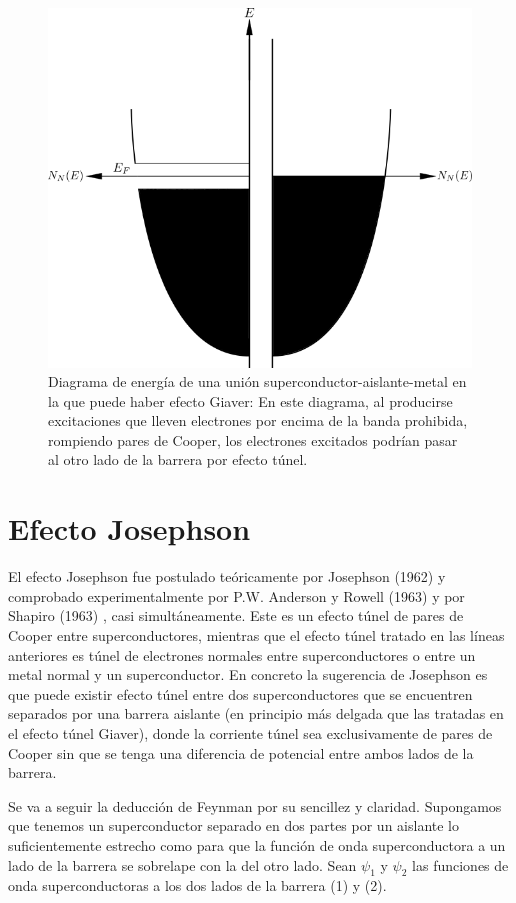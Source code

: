 \begin{figure}[H]
\centering \includegraphics[width=0.8\linewidth]{img/el3.png}
\caption[Diagrama de energía de una unión superconductor-aislante-metal en la que puede haber efecto Giaver]{Diagrama de energía de una unión superconductor-aislante-metal en la que puede haber efecto Giaver: En este diagrama, al producirse excitaciones que lleven electrones por encima de la banda prohibida, rompiendo pares de Cooper, los electrones excitados podrían pasar al otro lado de la barrera por efecto túnel.}
\label{fig:el3}
\end{figure}

\section{Efecto Josephson}

El efecto Josephson fue postulado teóricamente por Josephson (1962) \cite{josephson} y comprobado experimentalmente por P.W. Anderson y Rowell (1963) \cite{rowell} y por Shapiro (1963) \cite{shapiro}, casi simultáneamente. Este es un efecto túnel de pares de Cooper entre superconductores, mientras que el efecto túnel tratado en las líneas anteriores es túnel de electrones normales entre superconductores o entre un metal normal y un superconductor. En concreto la sugerencia de Josephson es que puede existir efecto túnel entre dos superconductores que se encuentren separados por una barrera aislante (en principio más delgada que las tratadas en el efecto túnel Giaver), donde la corriente túnel sea exclusivamente de pares de Cooper sin que se tenga una diferencia de potencial entre ambos lados de la barrera.

Se va a seguir la deducción de Feynman por su sencillez y claridad. Supongamos que tenemos un superconductor separado en dos partes por un aislante lo suficientemente estrecho como para que la función de onda superconductora a un lado de la barrera se sobrelape con la del otro lado. Sean $\psi_1$ y $\psi_2$ las funciones de onda superconductoras a los dos lados de la barrera (1) y (2).

